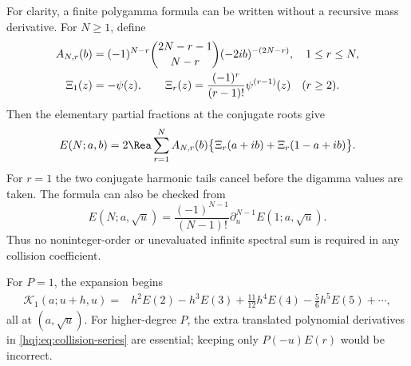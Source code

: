 For clarity, a finite polygamma formula can be written without a
recursive mass derivative. For $N\ge1$, define
\begin{align}
A_{N,r}(b)&=(-1)^{N-r}\binom{2N-r-1}{N-r}(-2ib)^{-(2N-r)},
\quad 1\le r\le N,\notag\\
\Xi_1(z)&=-\psi(z),\qquad
\Xi_r(z)=\frac{(-1)^r}{(r-1)!}\psi^{(r-1)}(z)\quad(r\ge2).
\end{align}
Then the elementary partial fractions at the conjugate roots give
\begin{equation}\label{hqj:eq:finite-polygamma}
E(N;a,b)=2\Rea\sum_{r=1}^N A_{N,r}(b)
\bigl\{\Xi_r(a+ib)+\Xi_r(1-a+ib)\bigr\}.
\end{equation}
For $r=1$ the two conjugate harmonic tails cancel before the digamma
values are taken. The formula can also be checked from
\begin{equation}\label{hqj:eq:resolvent-derivative}
E(N;a,\sqrt u)=\frac{(-1)^{N-1}}{(N-1)!}
\partial_u^{N-1}E(1;a,\sqrt u).
\end{equation}
Thus no noninteger-order or unevaluated infinite spectral sum is
required in any collision coefficient.

For $P=1$, the expansion begins
\begin{align}
\mathcal K_1(a;u+h,u)
={}&h^2E(2)-h^3E(3)+\tfrac{11}{12}h^4E(4)
-\tfrac56h^5E(5)+\cdots,
\label{hqj:eq:collision-low}
\end{align}
all at $(a,\sqrt u)$. For higher-degree $P$, the extra translated
polynomial derivatives in \eqref{hqj:eq:collision-series} are essential;
keeping only $P(-u)E(r)$ would be incorrect.


